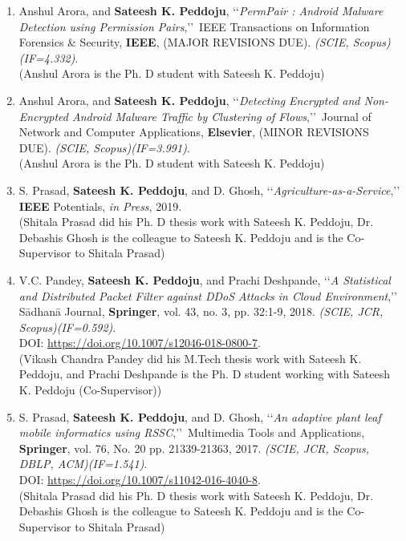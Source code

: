 \begin{enumerate}%
	\item
	Anshul Arora, and \textbf{Sateesh K. Peddoju}, \lq\lq \textit{PermPair :  Android Malware Detection using Permission Pairs},\rq\rq\, IEEE Transactions on Information Forensics \& Security, \textbf{IEEE}, (MAJOR REVISIONS DUE). \emph{(SCIE, Scopus)(IF=4.332)}.   \\(Anshul Arora is the Ph. D student with Sateesh K. Peddoju)

	\item
	Anshul Arora, and \textbf{Sateesh K. Peddoju}, \lq\lq \textit{Detecting Encrypted and Non-Encrypted Android Malware Traffic by Clustering of Flows},\rq\rq\, Journal of Network and Computer Applications, \textbf{Elsevier}, (MINOR REVISIONS DUE). \emph{(SCIE, Scopus)(IF=3.991)}. \\(Anshul Arora is the Ph. D student with Sateesh K. Peddoju)

	\item
	S. Prasad, \textbf{Sateesh K. Peddoju}, and D. Ghosh, \lq\lq \textit{Agriculture-as-a-Service},\rq\rq\, {\textbf{IEEE} Potentials}, \textit{in Press}, 2019.  \\(Shitala Prasad did his Ph. D thesis work with Sateesh K. Peddoju, Dr. Debashis Ghosh is the colleague to Sateesh K. Peddoju and is the Co-Supervisor to Shitala Prasad)
	
	\item
	V.C. Pandey, \textbf{Sateesh K. Peddoju}, and Prachi Deshpande, \lq\lq \textit{A Statistical and Distributed Packet Filter against DDoS Attacks in Cloud Environment},\rq\rq\, S{\={a}}dhan{\={a}} Journal, \textbf{Springer}, vol. 43, no. 3, pp. 32:1-9, 2018. \emph{(SCIE, JCR, Scopus)(IF=0.592)}. \\DOI: \url{https://doi.org/10.1007/s12046-018-0800-7}.  \\(Vikash Chandra Pandey did his M.Tech thesis work with Sateesh K. Peddoju, and Prachi Deshpande is the Ph. D student working with Sateesh K. Peddoju (Co-Supervisor))
	
	\item
	S. Prasad, \textbf{Sateesh K. Peddoju}, and D. Ghosh, \lq\lq \textit{An adaptive plant leaf mobile informatics using RSSC},\rq\rq\, Multimedia Tools and Applications, \textbf{Springer}, vol. 76, No. 20 pp. 21339-21363, 2017. \emph{(SCIE, JCR, Scopus, DBLP, ACM)(IF=1.541)}. \\DOI: \url{https://doi.org/10.1007/s11042-016-4040-8}.  \\(Shitala Prasad did his Ph. D thesis work with Sateesh K. Peddoju, Dr. Debashis Ghosh is the colleague to Sateesh K. Peddoju and is the Co-Supervisor to Shitala Prasad)
	

\end{enumerate}
